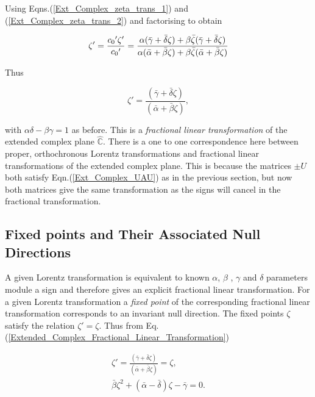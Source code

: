 \noindent Using Eqns.(\ref{Ext_Complex_zeta_trans_1}) and (\ref{Ext_Complex_zeta_trans_2}) and factorising to obtain

\begin{equation*}
\zeta' = \frac{{c_0}'\zeta'}{{c_0}'} = \frac{\alpha(\bar{\gamma} + \bar{\delta}\zeta) + \beta \bar{\zeta}(\bar{\gamma} + \bar{\delta}\zeta)}{\alpha(\bar{\alpha} + \bar{\beta}\zeta) + \beta \bar{\zeta}(\bar{\alpha} + \bar{\beta}\zeta)} \\
\end{equation*}

\noindent Thus 

\begin{equation}\label{Extended_Complex_Fractional_Linear_Transformation}
\zeta' = \frac{(\bar{\gamma} + \bar{\delta}\zeta)}{(\bar{\alpha} + \bar{\beta}\zeta)},
\end{equation}

\noindent with $\alpha\delta - \beta\gamma = 1$ as before. This is a \textit{fractional linear transformation} of the extended complex plane $\hat{\mathbb{C}}$. There is a one to one correspondence here between proper, orthochronous Lorentz transformations and fractional linear transformations of the extended complex plane. This is because the matrices $\pm U$ both satisfy Eqn.(\ref{Ext_Complex_UAU}) as in the previous section, but now both matrices give the same transformation as the signs will cancel in the fractional transformation.

\subsection{Fixed points and Their Associated Null Directions}

A given Lorentz transformation is equivalent to known $\alpha$, $\beta$ , $\gamma$ and $\delta$ parameters module a sign and therefore gives an explicit fractional linear transformation. For a given Lorentz transformation a \textit{fixed point} of the corresponding fractional linear transformation corresponds to an invariant null direction. The fixed points $\zeta$ satisfy the relation $\zeta' = \zeta$. Thus from Eq.(\ref{Extended_Complex_Fractional_Linear_Transformation})

\begin{gather}\nonumber
\zeta' = \frac{(\bar{\gamma} + \bar{\delta}\zeta)}{(\bar{\alpha} + \bar{\beta}\zeta)} = \zeta, \\\label{Ext_Complex_fixed_point}
\bar{\beta}\zeta^2 + (\bar{\alpha}- \bar{\delta})\zeta - \bar{\gamma} = 0. 
\end{gather}

